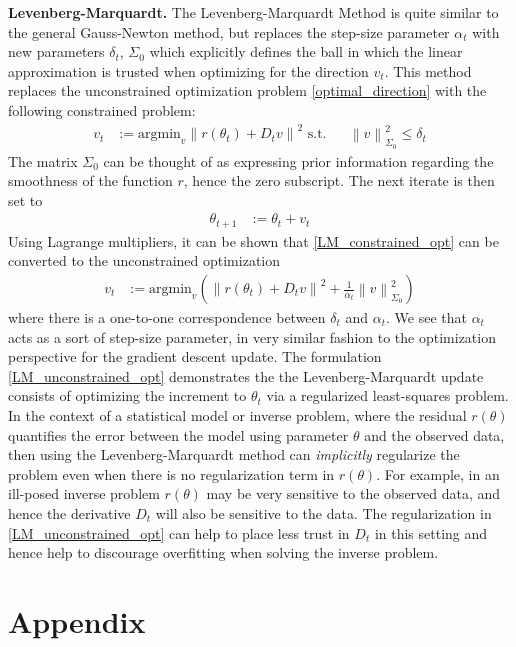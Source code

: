 \documentclass[12pt]{article}
\newcommand*{\norm}[1]{\left\lVert#1\right\rVert}
\begin{document}
\bigskip
\noindent
\textbf{Levenberg-Marquardt.}
The Levenberg-Marquardt Method is quite similar to the general Gauss-Newton method, but replaces the step-size parameter $\alpha_t$ with new parameters $\delta_t$, $\Sigma_0$ which explicitly defines 
the ball in which the linear approximation is trusted when optimizing for the direction $v_t$. This method replaces the unconstrained optimization problem \ref{optimal_direction} with the following 
constrained problem:
\begin{align}
v_t &:= \text{argmin}_v \norm{r(\theta_t) + D_t v}^2 \text{   s.t.} && \norm{v}^2_{\Sigma_0} \leq \delta_t \label{LM_constrained_opt}
\end{align}
The matrix $\Sigma_0$ can be thought of as expressing prior information regarding the smoothness of the function $r$, hence the zero subscript. The next iterate is then set to 
\begin{align*}
\theta_{t+1} &:= \theta_t + v_t
\end{align*}
Using Lagrange multipliers, it can be shown that \ref{LM_constrained_opt} can be converted to the unconstrained optimization 
\begin{align}
v_t &:= \text{argmin}_v\left( \norm{r(\theta_t) + D_t v}^2 + \frac{1}{\alpha_t} \norm{v}^2_{\Sigma_0}\right) \label{LM_unconstrained_opt}
\end{align}
where there is a one-to-one correspondence between $\delta_t$ and $\alpha_t$. We see that $\alpha_t$ acts as a sort of step-size parameter, in very similar fashion to the optimization perspective 
for the gradient descent update. The formulation \ref{LM_unconstrained_opt} demonstrates the the Levenberg-Marquardt update consists of optimizing the increment to $\theta_t$ via a regularized 
least-squares problem. In the context of a statistical model or inverse problem, where the residual $r(\theta)$ quantifies the error between the model using parameter $\theta$ and the observed data, then 
using the Levenberg-Marquardt method can \textit{implicitly} regularize the problem even when there is no regularization term in $r(\theta)$. For example, in an ill-posed inverse problem $r(\theta)$ may be very 
sensitive to the observed data, and hence the derivative $D_t$ will also be sensitive to the data. The regularization in \ref{LM_unconstrained_opt} can help to place less trust in $D_t$ in this setting and hence 
help to discourage overfitting when solving the inverse problem.  



\section{Appendix}
\end{document}
